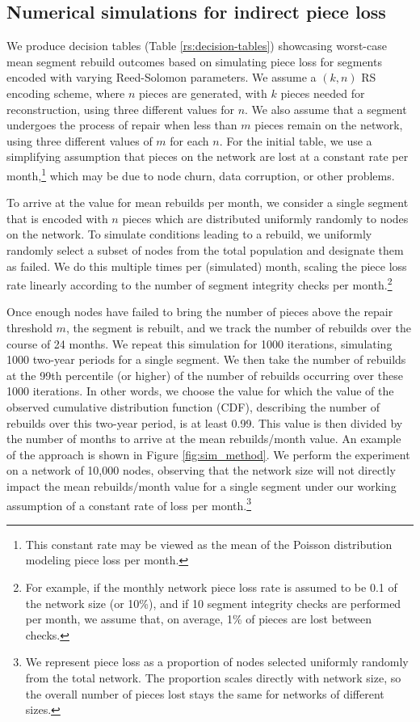
\subsection{Numerical simulations for indirect piece loss}\label{sec:RS-sim}

We produce decision tables (Table \ref{rs:decision-tables}) showcasing
worst-case mean segment rebuild outcomes based on simulating piece loss for segments encoded with varying Reed-Solomon parameters.
We assume a $(k,n)$ RS encoding scheme, where $n$ pieces are generated, with
$k$ pieces needed for reconstruction, using three different values for $n$.
We also assume that a segment undergoes the process of repair when less than $m$ pieces remain on the network, using three different values of $m$ for each $n$.
For the initial table, we use a simplifying assumption that pieces on the network are lost at a constant rate per month,\footnote{This constant rate may be viewed as the mean of the Poisson distribution modeling piece loss per month.} which may be due to node churn, data corruption, or other problems.

To arrive at the value for mean rebuilds per month, we consider a single segment that is encoded with $n$ pieces which are distributed uniformly randomly to nodes on the network. To simulate conditions leading to a rebuild, we uniformly randomly select a subset of nodes from the total population and designate them as failed. We do this multiple times per (simulated) month, scaling the piece loss rate linearly according to the number of segment integrity checks per month.\footnote{
For example, if the monthly network piece loss rate is assumed to be 0.1 of the network size (or 10\%), and if 10 segment integrity checks are performed per month, we assume that, on average, 1\% of pieces are lost between checks.}

Once enough nodes have failed to bring the number of pieces above the repair threshold $m$, the segment is rebuilt, and we track the number of rebuilds over the course of 24 months.
We repeat this simulation for 1000 iterations, simulating 1000 two-year periods for a single segment. We then take the number of rebuilds at the 99th percentile (or higher) of the number of rebuilds occurring over these 1000 iterations. In other words, we choose the value for which the value of the observed cumulative distribution function (CDF), describing the number of rebuilds over this two-year period, is at least 0.99. This value is then divided by the number of months to arrive at the mean rebuilds/month value. An example of the approach is shown in Figure \ref{fig:sim_method}. We perform the experiment on a network of 10,000 nodes, observing that the network size will not directly impact the mean rebuilds/month value for a single segment under our working assumption of a constant rate of loss per month.\footnote{We represent piece loss as a proportion of nodes selected uniformly randomly from the total network. The proportion scales directly with network size, so the overall number of pieces lost stays the same for networks of different sizes.}

